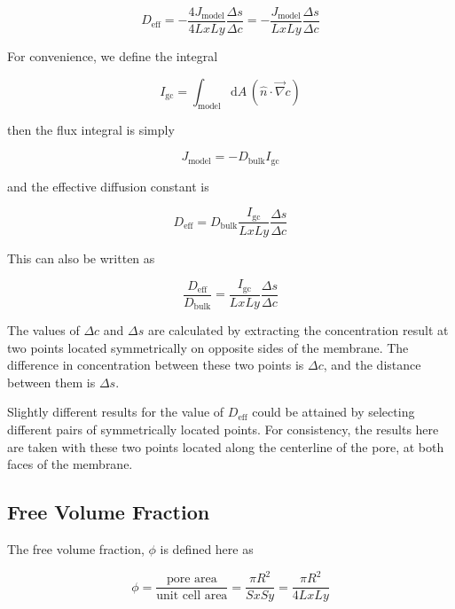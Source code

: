 \begin{equation}
D_{\mathrm{eff}} = - \frac{4 J_{\mathrm{model}}}{4 Lx Ly} \frac{\Delta s}{\Delta c}
 = - \frac{J_{\mathrm{model}}}{Lx Ly} \frac{\Delta s}{\Delta c}
\end{equation}

For convenience, we define the integral

\begin{equation}
I_{\mathrm{gc}} = \int_{\mathrm{model}} \mathrm{d}A\, \left(\hat{n} \cdot \vec{\nabla} c \right)
\end{equation}

then the flux integral is simply

\begin{equation}
J_{\mathrm{model}} = - D_{\mathrm{bulk}} I_\mathrm{gc}
\end{equation}

and the effective diffusion constant is

\begin{equation}
D_{\mathrm{eff}} = D_{\mathrm{bulk}} \frac{I_\mathrm{gc}}{Lx Ly} \frac{\Delta s}{\Delta c}
\end{equation}

This can also be written as

\begin{equation}
\frac{D_{\mathrm{eff}}}{D_{\mathrm{bulk}}} = \frac{I_\mathrm{gc}}{Lx Ly} \frac{\Delta s}{\Delta c}
\end{equation}

The values of $\Delta c$ and $\Delta s$ are calculated by extracting
the concentration result at two points located symmetrically on opposite sides of the membrane.
The difference in concentration between these two points is $\Delta c$,
and the distance between them is $\Delta s$.

Slightly different results for the value of $D_{\mathrm{eff}}$ could be attained by selecting different
pairs of symmetrically located points.
For consistency, the results here are taken with these two points located
along the centerline of the pore, at both faces of the membrane.

\subsection{Free Volume Fraction}\label{subsec:volfrac}

The free volume fraction, $\phi$ is defined here as

\begin{equation}
\phi = \frac{\text{pore area}}{\text{unit cell area}}
= \frac{\pi R^2}{Sx Sy} = \frac{\pi R^2}{4 Lx Ly}
\end{equation}
